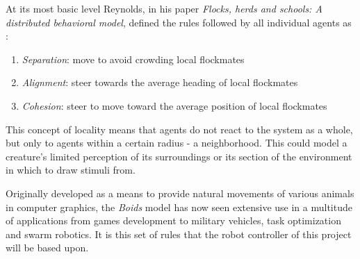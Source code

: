At its most basic level Reynolds, in his paper \textit{Flocks, herds and schools: A distributed behavioral model}, defined the rules followed by all individual agents as \cite{Reynolds:1987:FHS:37402.37406}:

\begin{enumerate}
	\item \textit{Separation}: move to avoid crowding local flockmates
	\item \textit{Alignment}: steer towards the average heading of local flockmates
	\item \textit{Cohesion}: steer to move toward the average position of local flockmates
\end{enumerate}

This concept of locality means that agents do not react to the system as a whole, but only to agents within a certain radius - a neighborhood. This could model a creature’s limited perception of its surroundings or its section of the environment in which to draw stimuli from.

Originally developed as a means to provide natural movements of various animals in computer graphics,
the \textit{Boids} model has now seen extensive use in a multitude of applications from games development to military vehicles, task optimization and swarm robotics. It is this set of rules that the robot controller of this project will be based upon.




